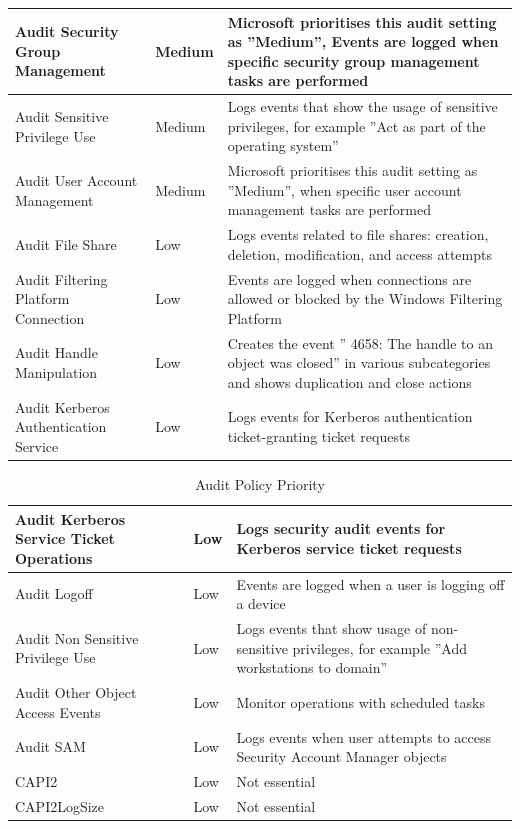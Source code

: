 \begin{table}[H]
\begin{tabular}{| p{5cm} | p{1.5cm} | p{9.5cm} |}
        Audit Security Group Management & Medium & Microsoft prioritises  this audit setting as ''Medium'', Events are logged when specific security group management tasks are performed \\ \hline
        Audit Sensitive Privilege Use & Medium & Logs events that show the usage of sensitive privileges, for example ''Act as part of the operating system'' \\ \hline
        Audit User Account Management & Medium & Microsoft prioritises this audit setting as ''Medium'', when specific user account management tasks are performed \\ \hline
        Audit File Share & Low & Logs events related to file shares: creation, deletion, modification, and access attempts \\ \hline
        Audit Filtering Platform Connection & Low & Events are logged when connections are allowed or blocked by the Windows Filtering Platform \\ \hline
        Audit Handle Manipulation & Low & Creates the event '' 4658: The handle to an object was closed'' in various subcategories and shows duplication and close actions\\ \hline
        Audit Kerberos Authentication Service & Low & Logs events for Kerberos authentication ticket-granting ticket requests \\ \hline
    \end{tabular}
\end{table}
\begin{table}[H]
    \centering
    \begin{tabular}{| p{5cm} | p{1.5cm} | p{9.5cm} |} \hline 
        Audit Kerberos Service Ticket Operations & Low &Logs security audit events for Kerberos service ticket requests \\ \hline
        Audit Logoff & Low & Events are logged when a user is logging off a device\\ \hline
        Audit Non Sensitive Privilege Use & Low & Logs events that show usage of non-sensitive privileges, for example ''Add workstations to domain'' \\ \hline
        Audit Other Object Access Events & Low & Monitor operations with scheduled tasks \\ \hline
        Audit SAM & Low & Logs events when user attempts to access Security Account Manager objects \\ \hline
        CAPI2 & Low & Not essential \\ \hline
        CAPI2LogSize & Low & Not essential \\ \hline
    \end{tabular}
    \caption{Audit Policy Priority \cite{SecAuditFAQ}}
\end{table}


